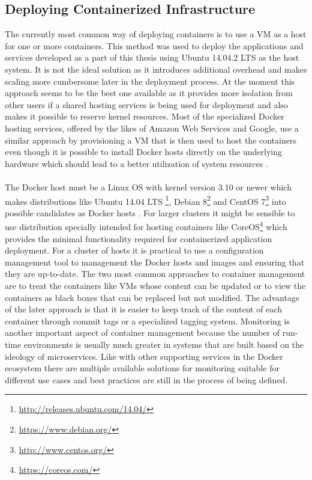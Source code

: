 \subsection{Deploying Containerized Infrastructure}

The currently most common way of deploying containers is to use a VM as a host for one or more containers. This method was used to deploy the applications and services developed as a part of this thesis using Ubuntu 14.04.2 LTS as the host system. It is not the ideal solution as it introduces additional overhead and makes scaling more cumbersome later in the deployment process. At the moment this approach seems to be the best one available as it provides more isolation from other users if a shared hosting services is being used for deployment and also makes it possible to reserve kernel resources. Most of the specialized Docker hosting services, offered by the likes of Amazon Web Services and Google, use a similar approach by provisioning a VM that is then used to host the containers even though it is possible to install Docker hosts directly on the underlying hardware which should lead to a better utilization of system resources \cite{mouat2015docker}.
\\ \\
The Docker host must be a Linux OS with kernel version 3.10 or newer which makes distributions like Ubuntu 14.04 LTS \footnote{\url{http://releases.ubuntu.com/14.04/}}, Debian 8\footnote{\url{https://www.debian.org/}} and CentOS 7\footnote{\url{http://www.centos.org/}} into possible candidates as Docker hosts \cite{dockerBinaries}. For larger clusters it might be sensible to use distribution specially intended for hosting containers like CoreOS\footnote{\url{https://coreos.com/}} which provides the minimal functionality required for containerized application deployment. For a cluster of hosts it is practical to use a configuration management tool to management the Docker hosts and images and ensuring that they are up-to-date. The two most common approaches to container management are to treat the containers like VMs whose content can be updated or to view the containers as black boxes that can be replaced but not modified. The advantage of the later approach is that it is easier to keep track of the content of each container through commit tags or a specialized tagging system. Monitoring is another important aspect of container management because the number of run-time environments is usually much greater in systems that are built based on the ideology of microservices. Like with other supporting services in the Docker ecosystem there are multiple available solutions for monitoring suitable for different use cases and best practices are still in the process of being defined.

